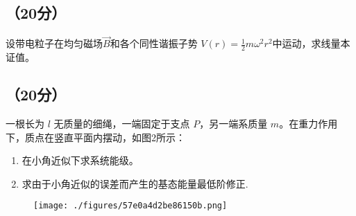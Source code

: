 \subsection{（20分）}
设带电粒子在均匀磁场$\vec{B}$和各个同性谐振子势 $V(r) = \frac{1}{2}m\omega^2 r^2$中运动，求线量本证值。

\subsection{（20分）}
一根长为 $l$ 无质量的细绳，一端固定于支点 $P$，另一端系质量 $m$。在重力作用下，质点在竖直平面内摆动，如图2所示：
    \begin{enumerate}
        \item 在小角近似下求系统能级。
        \item 求由于小角近似的误差而产生的基态能量最低阶修正.
    \end{enumerate}
    \begin{figure}[ht]
    \centering
    \texttt{[image: ./figures/57e0a4d2be86150b.png]}
    \caption{} \label{fig_SEU01_2}
    \end{figure}
